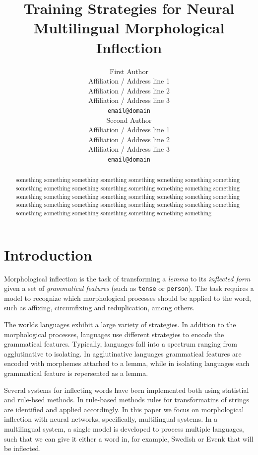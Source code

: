 \documentclass[11pt,a4paper]{article}
\title{Training Strategies for Neural Multilingual Morphological Inflection}
\author{First Author \\
  Affiliation / Address line 1 \\
  Affiliation / Address line 2 \\
  Affiliation / Address line 3 \\
  \texttt{email@domain} \\\And
  Second Author \\
  Affiliation / Address line 1 \\
  Affiliation / Address line 2 \\
  Affiliation / Address line 3 \\
  \texttt{email@domain} \\}
\date{}
\begin{document}
\maketitle
\begin{abstract}
something something something something something something
something something something something something something
something something something something something something
something something something something something something
something something something something something something
something something something something something something
something something something 
\end{abstract}

\section{Introduction}


Morphological inflection is the task of transforming a \emph{lemma} to
its \emph{inflected form} given a set of \emph{grammatical features}
(such as \texttt{tense} or \texttt{person}).  The task requires a
model to recognize which morphological processes should be applied to
the word, such as affixing, circumfixing and reduplication, among
others.

The worlds languages exhibit a large variety of strategies. In
addition to the morphological processes, languages use different
strategies to encode the grammatical features. Typically, languages
fall into a spectrum ranging from agglutinative to isolating. In
agglutinative languages grammatical features are encoded with
morphemes attached to a lemma, while in isolating languages each
grammatical feature is repersented as a lemma.

Several systems for inflecting words have been implemented both using
statistial and rule-bsed methods. In rule-based methods rules for
transformatins of strings are identified and applied accordingly. In
this paper we focus on morphological inflection with neural networks,
specifically, multilingual systems. In a multilingual system, a single
model is developed to process multiple languages, such that we can
give it either a word in, for example, Swedish or Evenk that will be
inflected.
\end{document}
